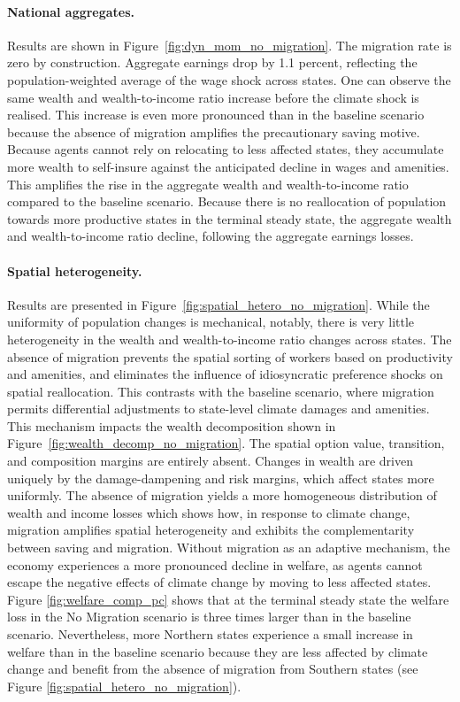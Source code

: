 \documentclass[12pt, a4paper]{article}
\begin{document}
\paragraph{National aggregates.} Results are shown in Figure~\ref{fig:dyn_mom_no_migration}. The migration rate is zero by construction. Aggregate earnings drop by 1.1 percent, reflecting the population-weighted average of the wage shock across states. One can observe the same wealth and wealth-to-income ratio increase before the climate shock is realised. This increase is even more pronounced than in the baseline scenario because the absence of migration amplifies the precautionary saving motive. Because agents cannot rely on relocating to less affected states, they accumulate more wealth to self-insure against the anticipated decline in wages and amenities. This amplifies the rise in the aggregate wealth and wealth-to-income ratio compared to the baseline scenario. Because there is no reallocation of population towards more productive states in the terminal steady state, the aggregate wealth and wealth-to-income ratio decline, following the aggregate earnings losses.



\paragraph{Spatial heterogeneity.} Results are presented in Figure~\ref{fig:spatial_hetero_no_migration}. While the uniformity of population changes is mechanical, notably, there is very little heterogeneity in the wealth and wealth-to-income ratio changes across states. The absence of migration prevents the spatial sorting of workers based on productivity and amenities, and eliminates the influence of idiosyncratic preference shocks on spatial reallocation. This contrasts with the baseline scenario, where migration permits differential adjustments to state-level climate damages and amenities. This mechanism impacts the wealth decomposition shown in Figure~\ref{fig:wealth_decomp_no_migration}. The spatial option value, transition, and composition margins are entirely absent. Changes in wealth are driven uniquely by the damage-dampening and risk margins, which affect states more uniformly. The absence of migration yields a more homogeneous distribution of wealth and income losses which shows how, in response to climate change, migration amplifies spatial heterogeneity and exhibits the complementarity between saving and migration. Without migration as an adaptive mechanism, the economy experiences a more pronounced decline in welfare, as agents cannot escape the negative effects of climate change by moving to less affected states. Figure \ref{fig:welfare_comp_pc} shows that at the terminal steady state the welfare loss in the No Migration scenario is three times larger than in the baseline scenario. Nevertheless, more Northern states experience a small increase in welfare than in the baseline scenario because they are less affected by climate change and benefit from the absence of migration from Southern states (see Figure \ref{fig:spatial_hetero_no_migration}).
\end{document}
